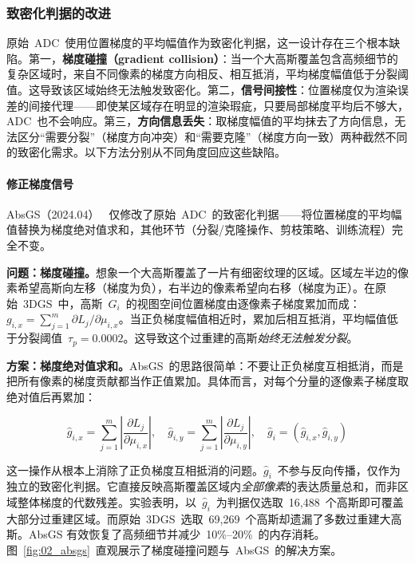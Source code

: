 \subsubsection{致密化判据的改进}

原始~ADC~使用位置梯度的平均幅值作为致密化判据，这一设计存在三个根本缺陷。第一，\textbf{梯度碰撞（gradient collision）}：当一个大高斯覆盖包含高频细节的复杂区域时，来自不同像素的梯度方向相反、相互抵消，平均梯度幅值低于分裂阈值。这导致该区域始终无法触发致密化。第二，\textbf{信号间接性}：位置梯度仅为渲染误差的间接代理——即使某区域存在明显的渲染瑕疵，只要局部梯度平均后不够大，ADC~也不会响应。第三，\textbf{方向信息丢失}：取梯度幅值的平均抹去了方向信息，无法区分“需要分裂”（梯度方向冲突）和“需要克隆”（梯度方向一致）两种截然不同的致密化需求。以下方法分别从不同角度回应这些缺陷。

\paragraph{修正梯度信号}

AbsGS（2024.04）~\cite{2404_10484} 仅修改了原始~ADC~的致密化判据——将位置梯度的平均幅值替换为梯度绝对值求和，其他环节（分裂/克隆操作、剪枝策略、训练流程）完全不变。

\textbf{问题：梯度碰撞。}想象一个大高斯覆盖了一片有细密纹理的区域。区域左半边的像素希望高斯向左移（梯度为负），右半边的像素希望向右移（梯度为正）。在原始~3DGS~中，高斯~$G_i$~的视图空间位置梯度由逐像素子梯度累加而成：$g_{i,x} = \sum_{j=1}^m \partial L_j / \partial \mu_{i,x}$。当正负梯度幅值相近时，累加后相互抵消，平均幅值低于分裂阈值~$\tau_p = 0.0002$。这导致这个过重建的高斯\emph{始终无法触发分裂}。

\textbf{方案：梯度绝对值求和。}AbsGS~的思路很简单：不要让正负梯度互相抵消，而是把所有像素的梯度贡献都当作正值累加。具体而言，对每个分量的逐像素子梯度取绝对值后再累加：

\begin{equation}
\hat{g}_{i,x} = \sum_{j=1}^m \left|\frac{\partial L_j}{\partial \mu_{i,x}}\right|, \quad \hat{g}_{i,y} = \sum_{j=1}^m \left|\frac{\partial L_j}{\partial \mu_{i,y}}\right|, \quad \hat{g}_i = (\hat{g}_{i,x}, \hat{g}_{i,y})
\end{equation}

这一操作从根本上消除了正负梯度互相抵消的问题。$\hat{g}_i$~不参与反向传播，仅作为独立的致密化判据。它直接反映高斯覆盖区域内\emph{全部像素}的表达质量总和，而非区域整体梯度的代数残差。实验表明，以~$\hat{g}_i$~为判据仅选取~16{,}488~个高斯即可覆盖大部分过重建区域。而原始~3DGS~选取~69{,}269~个高斯却遗漏了多数过重建大高斯。AbsGS 有效恢复了高频细节并减少~10\%--20\%~的内存消耗。图~\ref{fig:02_absgs}~直观展示了梯度碰撞问题与~AbsGS~的解决方案。

